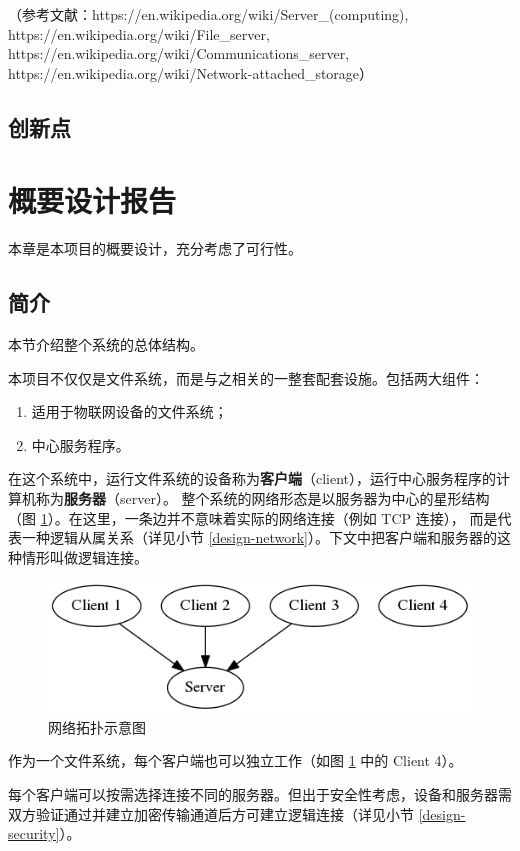 \documentclass{ctexart}
\begin{document}
（参考文献：https://en.wikipedia.org/wiki/Server_(computing), https://en.wikipedia.org/wiki/File_server, https://en.wikipedia.org/wiki/Communications_server, https://en.wikipedia.org/wiki/Network-attached_storage）

\subsection{创新点}

\section{概要设计报告}
本章是本项目的概要设计，充分考虑了可行性。

\subsection{简介}
本节介绍整个系统的总体结构。

本项目不仅仅是文件系统，而是与之相关的一整套配套设施。包括两大组件：
\begin{enumerate}
	\item 适用于物联网设备的文件系统；
	\item 中心服务程序。
\end{enumerate}
在这个系统中，运行文件系统的设备称为\textbf{客户端}（client），运行中心服务程序的计算机称为\textbf{服务器}（server）。
整个系统的网络形态是以服务器为中心的星形结构（图 \ref{design-net-topo}）。在这里，一条边并不意味着实际的网络连接（例如 TCP 连接），
而是代表一种逻辑从属关系（详见小节 \ref{design-network}）。下文中把客户端和服务器的这种情形叫做逻辑连接。

\begin{figure}
	\includegraphics[width=\textwidth]{design-net-topo.png}
	\caption{网络拓扑示意图}
	\label{design-net-topo}
\end{figure}

作为一个文件系统，每个客户端也可以独立工作（如图 \ref{design-net-topo} 中的 Client 4）。

每个客户端可以按需选择连接不同的服务器。但出于安全性考虑，设备和服务器需双方验证通过并建立加密传输通道后方可建立逻辑连接（详见小节 \ref{design-security}）。
\end{document}
